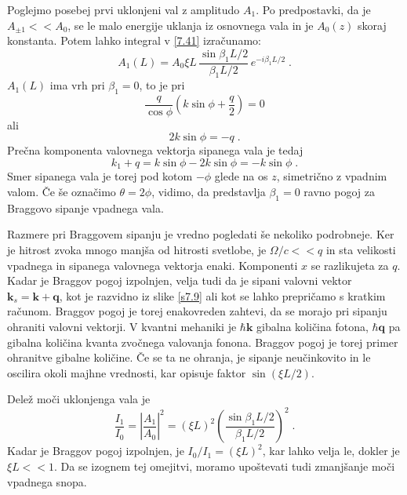 Poglejmo posebej prvi uklonjeni val z amplitudo $A_{1}$. Po predpostavki,
da je $A_{\pm1}<<A_{0}$, se le malo energije uklanja iz osnovnega
vala in je $A_{0}(z)$ skoraj konstanta. Potem lahko integral v \ref{7.41}
izračunamo: 
\begin{equation}
A_{1}(L)=A_{0}\xi L\,\frac{\sin\beta_{1}L/2}{\beta_{1}L/2}\, e^{-i\beta_{1}L/2}\;.\label{7.41}
\end{equation}
 $A_{1}(L)$ ima vrh pri $\beta_{1}=0$, to je pri 
\begin{equation}
\frac{q}{\cos\phi}(k\sin\phi+\frac{q}{2})=0\label{7.42}
\end{equation}
 ali 
\begin{equation}
2k\sin\phi=-q\;.\label{7.43}
\end{equation}
 Prečna komponenta valovnega vektorja sipanega vala je tedaj 
\begin{equation}
k_{1}+q=k\sin\phi-2k\sin\phi=-k\sin\phi\;.\label{7.44}
\end{equation}
 Smer sipanega vala je torej pod kotom $-\phi$ glede na os $z$,
simetrično z vpadnim valom. Če še označimo $\theta=2\phi$, vidimo,
da predstavlja $\beta_{1}=0$ ravno pogoj za Braggovo sipanje vpadnega
vala.

Razmere pri Braggovem sipanju je vredno pogledati še nekoliko podrobneje.
Ker je hitrost zvoka mnogo manjša od hitrosti svetlobe, je $\Omega/c<<q$
in sta velikosti vpadnega in sipanega valovnega vektorja enaki. Komponenti
$x$ se razlikujeta za $q$. Kadar je Braggov pogoj izpolnjen, velja
tudi da je sipani valovni vektor $\mathbf{k}_{s}=\mathbf{k}+\mathbf{q}$, kot
je razvidno iz slike \ref{s7.9} ali kot se lahko prepričamo s kratkim
računom. Braggov pogoj je torej enakovreden zahtevi, da se morajo
pri sipanju ohraniti valovni vektorji. V kvantni mehaniki je $\hbar\mathbf{k}$
gibalna količina fotona, $\hbar\mathbf{q}$ pa gibalna količina kvanta
zvočnega valovanja fonona. Braggov pogoj je torej primer ohranitve
gibalne količine. Če se ta ne ohranja, je sipanje neučinkovito in
le oscilira okoli majhne vrednosti, kar opisuje faktor $\sin(\xi L/2)$.

Delež moči uklonjenga vala je 
\begin{equation}
\frac{I_{1}}{I_{0}}=\left|\frac{A_{1}}{A_{0}}\right|^{2}=(\xi L)^{2}
\left(\frac{\sin\beta_{1}L/2}{\beta_{1}L/2}\right)^{2}\;.\label{7.45}
\end{equation}
 Kadar je Braggov pogoj izpolnjen, je $I_{0}/I_{1}=(\xi L)^{2}$,
kar lahko velja le, dokler je $\xi L<<1$. Da se izognem tej omejitvi,
moramo upoštevati tudi zmanjšanje moči vpadnega snopa.


